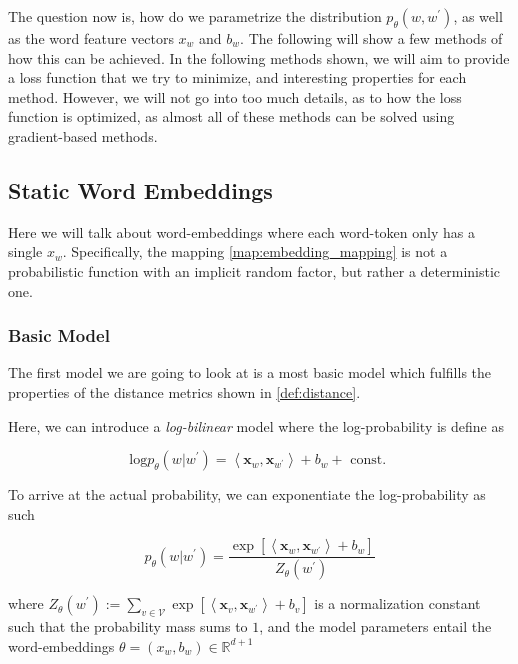\documentclass[a4paper,12pt,twoside,openright]{report}
\begin{document}
The question now is, how do we parametrize the distribution $p_\theta(w, w^{\prime})$, as well as the word feature vectors $x_w$ and $b_w$. 
The following will show a few methods of how this can be achieved.
In the following methods shown, we will aim to provide a loss function that we try to minimize, and interesting properties for each method.
However, we will not go into too much details, as to how the loss function is optimized, as almost all of these methods can be solved using gradient-based methods.

\newpage
\subsection{Static Word Embeddings}

Here we will talk about word-embeddings where each word-token only has a single $x_w$. 
Specifically, the mapping \eqref{map:embedding_mapping} is not a probabilistic function with an implicit random factor, but rather a deterministic one.

\subsubsection{Basic Model}

The first model we are going to look at is a most basic model which fulfills the properties of the distance metrics shown in \eqref{def:distance}.

Here, we can introduce a \textit{log-bilinear} model where the log-probability is define as

\begin{equation}
\text{log} p_{\theta}(w | w^{\prime}) = \left\langle\mathbf{x}_{w}, \mathbf{x}_{w^{\prime}}\right\rangle+b_{w} + \text { const. }
\end{equation}

To arrive at the actual probability, we can exponentiate the log-probability as such

$$
p_{\theta}\left(w | w^{\prime}\right)=\frac{\exp \left[\left\langle\mathbf{x}_{w}, \mathbf{x}_{w^{\prime}}\right\rangle+b_{w}\right]}{Z_{\theta}\left(w^{\prime}\right)}
$$

where $Z_{\theta}\left(w^{\prime}\right):=\sum_{v \in \mathcal{V}} \exp \left[\left\langle\mathbf{x}_{v}, \mathbf{x}_{w^{\prime}}\right\rangle+b_{v}\right]$ is a normalization constant such that the probability mass sums to $1$, and the model parameters entail the word-embeddings $\theta = (x_w, b_w) \in \mathbb{R}^{d+1}$
\end{document}
